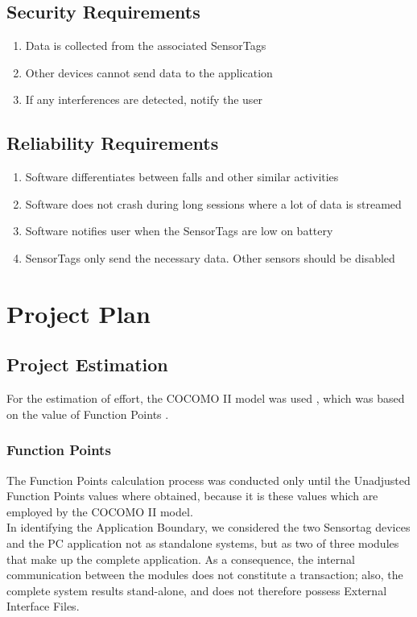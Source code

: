 \documentclass[conference,12pt]{IEEETran}
\begin{document}
\subsection{Security Requirements}

	\begin{enumerate}
		\item Data is collected from the associated SensorTags
		\item Other devices cannot send data to the application
		\item If any interferences are detected, notify the user
	\end{enumerate}


\subsection{Reliability Requirements}

	\begin{enumerate}
		\item Software differentiates between falls and other similar activities
		\item Software does not crash during long sessions where a lot of data is streamed
		\item Software notifies user when the SensorTags are low on battery
		\item SensorTags only send the necessary data. Other sensors should be disabled
	\end{enumerate}


\section{Project Plan}

\subsection{Project Estimation}
For the estimation of effort, the COCOMO II model was used \cite{cocomo}, which was based on the value of Function Points \cite{albrecht}.\\

    \subsubsection{Function Points}
    The Function Points calculation process was conducted only until the Unadjusted Function Points values where obtained, because it is these values which are employed by the COCOMO II model.\\
    In identifying the Application Boundary, we considered the two Sensortag devices and the PC application not as standalone systems, but as two of three modules that make up the complete application. As a consequence, the internal communication between the modules does not constitute a transaction; also, the complete system results stand-alone, and does not therefore possess External Interface Files.\\
    
\end{document}
